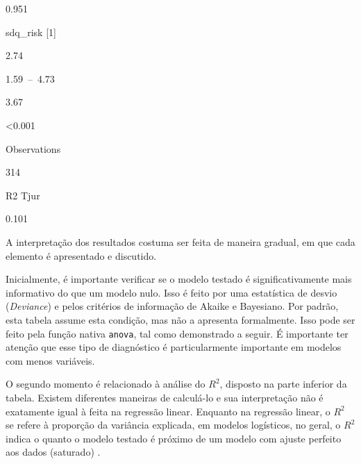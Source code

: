 \documentclass[
]{book}
\newenvironment{Shaded}{\begin{snugshade}}{\end{snugshade}}
\newcommand{\CommentTok}[1]{\textcolor[rgb]{0.56,0.35,0.01}{\textit{#1}}}
\newcommand{\DataTypeTok}[1]{\textcolor[rgb]{0.13,0.29,0.53}{#1}}
\newcommand{\DecValTok}[1]{\textcolor[rgb]{0.00,0.00,0.81}{#1}}
\newcommand{\KeywordTok}[1]{\textcolor[rgb]{0.13,0.29,0.53}{\textbf{#1}}}
\newcommand{\NormalTok}[1]{#1}
\newcommand{\OperatorTok}[1]{\textcolor[rgb]{0.81,0.36,0.00}{\textbf{#1}}}
\newcommand{\StringTok}[1]{\textcolor[rgb]{0.31,0.60,0.02}{#1}}
\begin{document}
0.951

sdq\_risk {[}1{]}

2.74

1.59~--~4.73

3.67

\textless0.001

Observations

314

R2 Tjur

0.101

A interpretação dos resultados costuma ser feita de maneira gradual, em que cada elemento é apresentado e discutido.

Inicialmente, é importante verificar se o modelo testado é significativamente mais informativo do que um modelo nulo. Isso é feito por uma estatística de desvio (\emph{Deviance}) e pelos critérios de informação de Akaike e Bayesiano. Por padrão, esta tabela assume esta condição, mas não a apresenta formalmente. Isso pode ser feito pela função nativa \texttt{anova}, tal como demonstrado a seguir. É importante ter atenção que esse tipo de diagnóstico é particularmente importante em modelos com menos variáveis.

\begin{Shaded}
\end{Shaded}

O segundo momento é relacionado à análise do \(R^2\), disposto na parte inferior da tabela. Existem diferentes maneiras de calculá-lo e sua interpretação não é exatamente igual à feita na regressão linear. Enquanto na regressão linear, o \(R^2\) se refere à proporção da variância explicada, em modelos logísticos, no geral, o \(R^2\) indica o quanto o modelo testado é próximo de um modelo com ajuste perfeito aos dados (saturado) \citep{portugues2020}.
\end{document}
